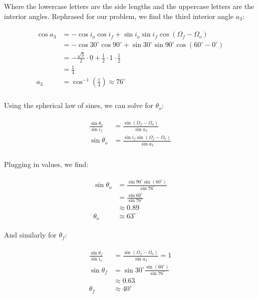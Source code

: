\documentclass[
]{article}
\begin{document}
Where the lowercase letters are the side lengths and the uppercase
letters are the interior angles. Rephrased for our problem, we find the
third interior angle \(a_3\):

\[\begin{aligned}
\begin{aligned}
    \cos a_3 &= - \cos i_o \cos i_f + \sin i_o \sin i_f \cos(\Omega_f - \Omega_o) \\
    &= - \cos 30^\circ \cos 90^\circ + \sin 30^\circ \sin 90^\circ \cos(60^\circ - 0^\circ) \\
    &= - \frac{\sqrt{3}}{2} \cdot 0 + \frac{1}{2} \cdot 1 \cdot \frac{1}{2} \\
    &= \frac{1}{4} \\
    a_3 &= \cos^{-1} \left( \frac{1}{4} \right) \approx 76^\circ \\
\end{aligned}
\end{aligned}\]

Using the spherical law of sines, we can solve for \(\theta_o\):

\[\begin{aligned}
\begin{aligned}
    \frac{\sin\theta_o}{\sin i_f} &= \frac{\sin(\Omega_f - \Omega_o)}{\sin a_3} \\
    \sin\theta_o &= \frac{\sin i_f \sin(\Omega_f - \Omega_o)}{\sin a_3} \\
\end{aligned}
\end{aligned}\]

Plugging in values, we find:

\[\begin{aligned}
\begin{aligned}
    \sin\theta_o &= \frac{\sin 90^\circ \sin(60^\circ)}{\sin 76^\circ} \\
    &= \frac{\sin 60^\circ}{\sin 76^\circ} \\
    &\approx 0.89 \\
    \theta_o &\approx 63^\circ
\end{aligned}
\end{aligned}\]

And similarly for \(\theta_f\):

\[\begin{aligned}
\begin{aligned}
    \frac{\sin\theta_f}{\sin i_o} &= \frac{\sin(\Omega_f - \Omega_o)}{\sin a_3} = 1 \\
    \sin\theta_f &= \sin 30^\circ \frac{\sin(60^\circ)}{\sin 76^\circ} \\
    &\approx 0.63 \\
    \theta_f &\approx 40^\circ
\end{aligned}
\end{aligned}\]
\end{document}

